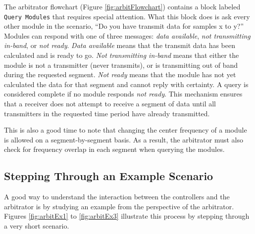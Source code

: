The arbitrator flowchart (Figure \ref{fig:arbitFlowchart}) contains
a block labeled \verb+Query Modules+ that requires special
attention. What this block does is ask every other module in the
scenario, ``Do you have transmit data for samples x to y?'' Modules
can respond with one of three messages: \emph{data available},
\emph{not transmitting in-band}, or \emph{not ready}. \emph{Data
available} means that the transmit data has been calculated and is
ready to go. \emph{Not transmitting in-band} means that either the
module is not a transmitter (never transmits), or is transmitting
out of band during the requested segment. \emph{Not ready} means
that the module has not yet calculated the data for that segment and
cannot reply with certainty.  A query is considered complete if no
module responds \emph{not ready}.  This mechanism ensures that a
receiver does not attempt to receive a segment of data until all
transmitters in the requested time period have already transmitted.

This is also a good time to note that changing the center frequency
of a module is allowed on a segment-by-segment basis.  As a result,
the arbitrator must also check for frequency overlap in each segment
when querying the modules.

\subsection{Stepping Through an Example Scenario}

A good way to understand the interaction between the controllers and
the arbitrator is by studying an example from the perspective of the
arbitrator. Figures \ref{fig:arbitEx1} to \ref{fig:arbitEx3}
illustrate this process by stepping through a very short scenario.



